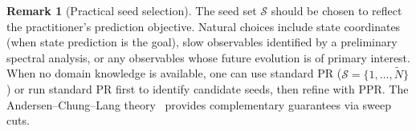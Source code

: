 \documentclass{article}
\theoremstyle{plain}
\theoremstyle{definition}
\newtheorem{remark}{Remark}
\begin{document}
\begin{remark}[Practical seed selection]\label{rem:practical}
	The seed set $\mathcal{S}$ should be chosen to reflect the practitioner's prediction objective. Natural choices include state coordinates (when state prediction is the goal), slow observables identified by a preliminary spectral analysis, or any observables whose future evolution is of primary interest. When no domain knowledge is available, one can use standard PR ($\mathcal{S} = \{1,\ldots,\tilde{N}\}$) or run standard PR first to identify candidate seeds, then refine with PPR. The Andersen--Chung--Lang theory~\cite{andersen2006local} provides complementary guarantees via sweep cuts.
\end{remark}
\end{document}
